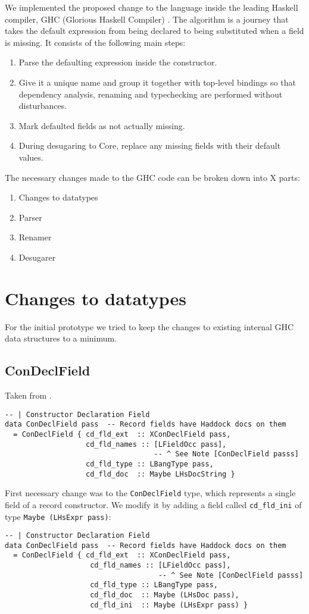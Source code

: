 \documentclass[en]{pracamgr}
\newcommand{\code}[1]{\lstinline[breaklines=true]{#1}}
\begin{document}
We implemented the proposed change to the language inside the leading Haskell compiler, GHC (Glorious Haskell Compiler) \cite{HudakHaskell}.
The algorithm is a journey that takes the default expression from being declared to being substituted when a field is missing.
It consists of the following main steps:
\begin{enumerate}
  \item Parse the defaulting expression inside the constructor.
  \item Give it a unique name and group it together with top-level bindings so that dependency analysis, renaming and typechecking are performed without disturbances.
  \item Mark defaulted fields as not actually missing.
  \item During desugaring to Core, replace any missing fields with their default values.
\end{enumerate}

The necessary changes made to the GHC code can be broken down into X parts:
\begin{enumerate}
  \item Changes to datatypes
  \item Parser
  \item Renamer
  \item Desugarer
\end{enumerate}

\section{Changes to datatypes} 

For the initial prototype we tried to keep the changes to existing internal GHC data structures to a minimum.
\subsection*{ConDeclField}
Taken from \cite{GHCConDeclFieldDef}.
\begin{lstlisting}
-- | Constructor Declaration Field
data ConDeclField pass  -- Record fields have Haddock docs on them
  = ConDeclField { cd_fld_ext  :: XConDeclField pass,
                   cd_fld_names :: [LFieldOcc pass],
                                   -- ^ See Note [ConDeclField passs]
                   cd_fld_type :: LBangType pass,
                   cd_fld_doc  :: Maybe LHsDocString }
\end{lstlisting}
First necessary change was to the \code{ConDeclField} type, which represents a single field of a record constructor.
We modify it by adding a field called \code{cd_fld_ini} of type \code{Maybe (LHsExpr pass)}:
\begin{lstlisting}
-- | Constructor Declaration Field
data ConDeclField pass  -- Record fields have Haddock docs on them
  = ConDeclField { cd_fld_ext  :: XConDeclField pass,
                    cd_fld_names :: [LFieldOcc pass],
                                    -- ^ See Note [ConDeclField passs]
                    cd_fld_type :: LBangType pass,
                    cd_fld_doc  :: Maybe (LHsDoc pass),
                    cd_fld_ini  :: Maybe (LHsExpr pass) }
\end{lstlisting}
\end{document}

